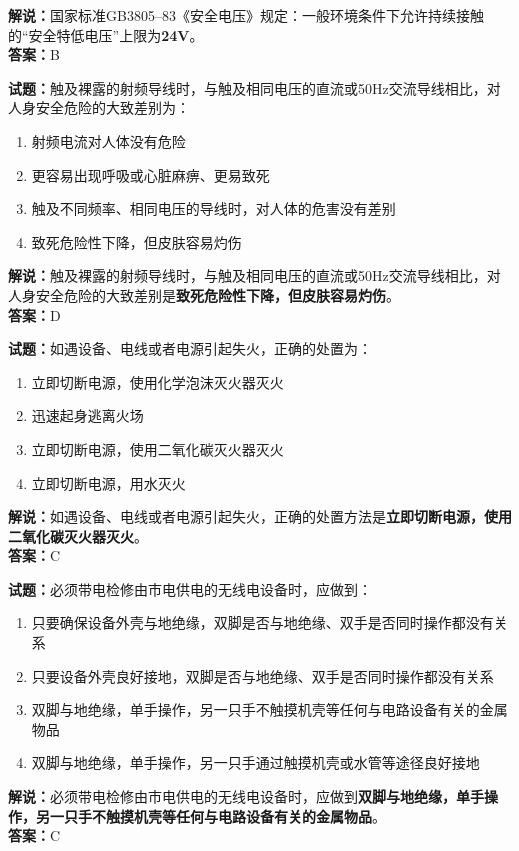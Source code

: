 \documentclass{ctexbook}
\begin{document}
\noindent\textbf{解说：}国家标准GB3805--83《安全电压》规定：一般环境条件下允许持续接触的“安全特低电压”上限为\textbf{\num{24}V}。\\\noindent\textbf{答案：}B%

\bigskip

\noindent\textbf{试题：}触及裸露的射频导线时，与触及相同电压的直流或50Hz交流导线相比，对人身安全危险的大致差别为：
\begin{enumerate}[leftmargin=3em]
  \item 射频电流对人体没有危险
  \item 更容易出现呼吸或心脏麻痹、更易致死
  \item 触及不同频率、相同电压的导线时，对人体的危害没有差别
  \item 致死危险性下降，但皮肤容易灼伤
\end{enumerate}
\noindent\textbf{解说：}触及裸露的射频导线时，与触及相同电压的直流或50Hz交流导线相比，对人身安全危险的大致差别是\textbf{致死危险性下降，但皮肤容易灼伤}。\\\noindent\textbf{答案：}D

\bigskip

\noindent\textbf{试题：}如遇设备、电线或者电源引起失火，正确的处置为：
\begin{enumerate}[leftmargin=3em]
  \item 立即切断电源，使用化学泡沫灭火器灭火
  \item 迅速起身逃离火场
  \item 立即切断电源，使用二氧化碳灭火器灭火
  \item 立即切断电源，用水灭火
\end{enumerate}
\noindent\textbf{解说：}如遇设备、电线或者电源引起失火，正确的处置方法是\textbf{立即切断电源，使用二氧化碳灭火器灭火}。\\\noindent\textbf{答案：}C

\bigskip

\noindent\textbf{试题：}必须带电检修由市电供电的无线电设备时，应做到：
\begin{enumerate}[leftmargin=3em]
  \item 只要确保设备外壳与地绝缘，双脚是否与地绝缘、双手是否同时操作都没有关系
  \item 只要设备外壳良好接地，双脚是否与地绝缘、双手是否同时操作都没有关系
  \item 双脚与地绝缘，单手操作，另一只手不触摸机壳等任何与电路设备有关的金属物品
  \item 双脚与地绝缘，单手操作，另一只手通过触摸机壳或水管等途径良好接地
\end{enumerate}
\noindent\textbf{解说：}必须带电检修由市电供电的无线电设备时，应做到\textbf{双脚与地绝缘，单手操作，另一只手不触摸机壳等任何与电路设备有关的金属物品}。\\\noindent\textbf{答案：}C
\bigskip
\end{document}
